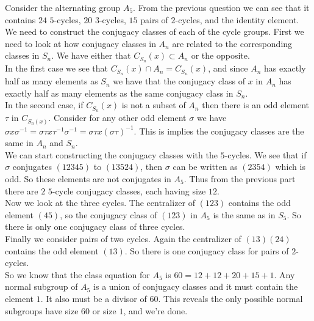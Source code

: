 \documentclass[12pt]{report}
\begin{document}
 Consider the alternating group $A_5$. From the
previous question we can see that it contains $24$ $5$-cycles, $20$ $3$-cycles,
$15$ pairs of $2$-cycles, and the identity element.\\

We need to construct the conjugacy classes of each of the cycle groups. First we
need to look at how conjugacy classes in $A_n$ are related to the corresponding
classes in $S_n$. We have either that $C_{S_n}(x) \subset A_n$ or the opposite.\\

In the first case we see that $C_{S_n}(x) \cap A_n = C_{S_n}(x)$, and since
$A_n$ has exactly half as many elements as $S_n$ we have that the conjugacy
class of $x$ in $A_n$ has exactly half as many elements as the same conjugacy
class in $S_n$.\\

In the second case, if $C_{S_n}(x)$ is not a subset of $A_n$ then there is an
odd element $\tau$ in $C_{S_n(x)}$. Consider for any other odd element $\sigma$
we have $\sigma x\sigma^{-1} = \sigma \tau x \tau^{-1} \sigma^{-1} = \sigma \tau
x (\sigma \tau)^{-1}$. This is implies the conjugacy classes are the same in
$A_n$ and $S_n$.\\

We can start constructing the conjugacy classes with the $5$-cycles. We see that
if $\sigma$ conjugates $(12345)$ to $(13524)$, then $\sigma$ can be written as
$(2354)$ which is odd. So these elements are not conjugates in $A_5$. Thus from
the previous part there are $2$ $5$-cycle conjugacy classes, each having size
$12$.\\

Now we look at the three cycles. The centralizer of $(123)$ contains the odd
element $(45)$, so the conjugacy class of $(123)$ in $A_5$ is the same as in
$S_5$. So there is only one conjugacy class of three cycles.\\

Finally we consider pairs of two cycles. Again the centralizer of $(13)(24)$
contains the odd element $(13)$. So there is one conjugacy class for pairs of
$2$-cycles.\\

So we know that the class equation for $A_5$ is $60 = 12 + 12 + 20 + 15 + 1$.
Any normal subgroup of $A_5$ is a union of conjugacy classes and it must contain
the element $1$. It also must be a divisor of $60$. This reveals the only
possible normal subgroups have size $60$ or size $1$, and we're done.\\
\end{document}
